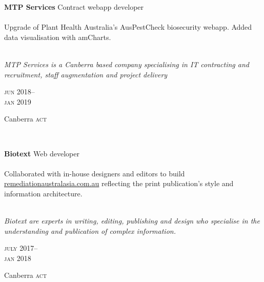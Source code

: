 \begin{minipage}[t]{0.75\textwidth}
\textbf{MTP Services}\phantom{..} Contract webapp developer\\
\\
Upgrade of Plant Health Australia's AusPestCheck biosecurity webapp. Added 
data visualisation with amCharts.
\\
\\
{\small
\textit{MTP Services is a Canberra based company specialising in IT contracting and recruitment, staff augmentation and project delivery} 
\par}
\end{minipage}
\begin{minipage}[t]{0.25\textwidth}
{
\hfill \textsc{jun} 2018--\\ 
\hspace*{0pt} \hfill \textsc{jan} 2019
\par
{\small\hfill Canberra \textsc{act}}
}
\end{minipage}
\\

\begin{minipage}[t]{0.75\textwidth}
\textbf{Biotext}\phantom{..} Web developer\\
\\
Collaborated with in-house designers and editors to build 
\href{https://www.remediationaustralasia.com.au/}{remediationaustralasia.com.au} 
reflecting the print publication's style and information architecture.
\\
\\
{\small
\textit{
Biotext are experts in writing, editing, publishing and design who specialise
in the understanding and publication of complex information.}
\par}
\end{minipage}
\begin{minipage}[t]{0.25\textwidth}
{
\hfill \textsc{july} 2017--\\ 
\hspace*{0pt} \hfill \textsc{jan} 2018
\par
{\small\hfill Canberra \textsc{act}}
}
\end{minipage}
\\

